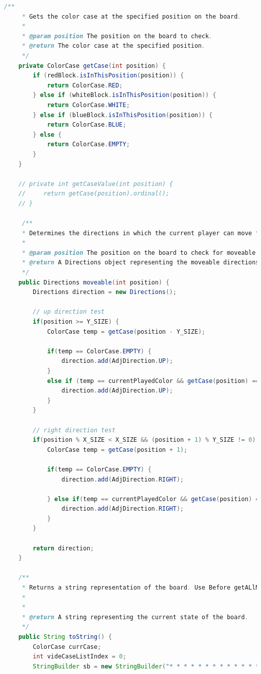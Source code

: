 \documentclass[a4paper,11pt]{article}
\begin{document}
\begin{lstlisting}[language=Java, breaklines=true]
     /**
     * Gets the color case at the specified position on the board.
     *
     * @param position The position on the board to check.
     * @return The color case at the specified position.
     */
    private ColorCase getCase(int position) {
        if (redBlock.isInThisPosition(position)) {
            return ColorCase.RED;
        } else if (whiteBlock.isInThisPosition(position)) {
            return ColorCase.WHITE;
        } else if (blueBlock.isInThisPosition(position)) {
            return ColorCase.BLUE;
        } else {
            return ColorCase.EMPTY;
        }
    }

    // private int getCaseValue(int position) {
    //     return getCase(position).ordinal();
    // }

     /**
     * Determines the directions in which the current player can move from the specified position.
     *
     * @param position The position on the board to check for moveable directions.
     * @return A Directions object representing the moveable directions from the specified position.
     */
    public Directions moveable(int position) {
        Directions direction = new Directions();

        // up direction test
        if(position >= Y_SIZE) {
            ColorCase temp = getCase(position - Y_SIZE);

            if(temp == ColorCase.EMPTY) {
                direction.add(AdjDirection.UP);
            }
            else if (temp == currentPlayedColor && getCase(position) == ColorCase.EMPTY) {
                direction.add(AdjDirection.UP);
            }
        }
        
        // right direction test
        if(position % X_SIZE < X_SIZE && (position + 1) % Y_SIZE != 0) {
            ColorCase temp = getCase(position + 1);

            if(temp == ColorCase.EMPTY) {
                direction.add(AdjDirection.RIGHT);

            } else if(temp == currentPlayedColor && getCase(position) == ColorCase.EMPTY) {
                direction.add(AdjDirection.RIGHT);
            }
        }

        return direction;
    }

    /**
     * Returns a string representation of the board. Use Before getALlMovements !
     * 
     *
     * @return A string representing the current state of the board.
     */
    public String toString() {
        ColorCase currCase;
        int videCaseListIndex = 0;
        StringBuilder sb = new StringBuilder("* * * * * * * * * * * * *\n*       *       *       *\n");


\end{lstlisting}
\end{document}

